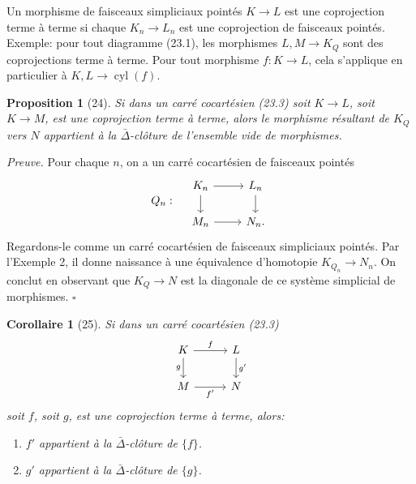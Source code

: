 \documentclass[11pt]{article}
\theoremstyle{deligne}
\newtheorem*{proposition*}{Proposition}
\newtheorem*{corollary*}{Corollaire}
\newenvironment{proofdel}{\noindent\textit{Preuve.}}{\hfill$\square$}
\newcommand{\cyl}{\operatorname{cyl}}
\begin{document}
Un morphisme de faisceaux simpliciaux pointés \(K\to L\) est une coprojection terme à terme si chaque \(K_n\to L_n\) est une coprojection de faisceaux pointés. Exemple: pour tout diagramme (23.1), les morphismes \(L,M\to K_Q\) sont des coprojections terme à terme. Pour tout morphisme \(f:K\to L\), cela s'applique en particulier à \(K,L\to \cyl(f)\).

\begin{proposition*}[24]
Si dans un carré cocartésien (23.3) soit \(K\to L\), soit \(K\to M\), est une coprojection terme à terme, alors le morphisme résultant de \(K_Q\) vers \(N\) appartient à la \(\bar\Delta\)-clôture de l'ensemble vide de morphismes.
\end{proposition*}

\begin{proofdel}
Pour chaque \(n\), on a un carré cocartésien de faisceaux pointés
\[
Q_n:\quad
\begin{tikzcd}[column sep=2.4em,row sep=1.6em]
K_n \arrow[r] \arrow[d] & L_n \arrow[d] \\
M_n \arrow[r] & N_n .
\end{tikzcd}
\]
Regardons-le comme un carré cocartésien de faisceaux simpliciaux pointés. Par l'Exemple 2, il donne naissance à une équivalence d'homotopie \(K_{Q_n}\to N_n\). On conclut en observant que \(K_Q\to N\) est la diagonale de ce système simplicial de morphismes.
\end{proofdel}

\begin{corollary*}[25]
Si dans un carré cocartésien (23.3)
\[
\begin{tikzcd}[column sep=2.8em,row sep=1.8em]
K \arrow[r,"f"] \arrow[d,"g"'] & L \arrow[d,"g'"] \\
M \arrow[r,"f'"'] & N
\end{tikzcd}
\]
soit \(f\), soit \(g\), est une coprojection terme à terme, alors:
\begin{enumerate}[label=\arabic*.]
\item \(f'\) appartient à la \(\bar\Delta\)-clôture de \(\{f\}\).
\item \(g'\) appartient à la \(\bar\Delta\)-clôture de \(\{g\}\).
\end{enumerate}
\end{corollary*}
\end{document}
